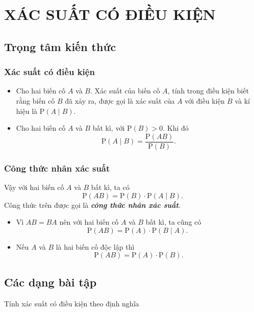 \setcounter{section}{0}
\section{XÁC SUẤT CÓ ĐIỀU KIỆN}
\subsection{Trọng tâm kiến thức}
\begin{tomtat}
	\subsubsection{Xác suất có điều kiện}
	\begin{boxdn}
	\begin{itemize}
	\item
	Cho hai biến cố $A$ và $B$. Xác suất của biến cố $A$, tính trong điều kiện biết rằng biến cố $B$ đã xảy ra, được gọi là xác suất của $A$ với điều kiện $B$ và kí hiệu là $\mathrm{P}(A\mid B)$.
	\item
	Cho hai biến cố $A$ và $B$ bất kì, với $\mathrm{P}(B)>0$. Khi đó
	$$\mathrm{P}(A \mid B)=\dfrac{\mathrm{P}(A B)}{\mathrm{P}(B)}.$$
	\end{itemize}
	\end{boxdn}
	\subsubsection{Công thức nhân xác suất}
	\begin{boxdn}
	Vậy với hai biến cố $A$ và $B$ bất kì, ta có
	$$\mathrm{P}(A B)=\mathrm{P}(B) \cdot \mathrm{P}(A \mid B).$$
	Công thức trên được gọi là \textbf{\textit{công thức nhân xác suất}}.
	\end{boxdn}
	\begin{note}
	\begin{itemize}
	\item Vì $AB=BA$ nên với hai biến cố $A$ và $B$ bất kì, ta cũng có
	$$\mathrm{P}(A B)=\mathrm{P}(A) \cdot \mathrm{P}(B \mid A) \text{. }$$
	\item Nếu $A$ và $B$ là hai biến cố độc lập thì
	$$\mathrm{P}(A B)=\mathrm{P}(A) \cdot \mathrm{P}(B).$$
	\end{itemize}
	\end{note}
\end{tomtat}
\subsection{Các dạng bài tập}
\begin{dang}{Tính xác suất có điều kiện theo định nghĩa}
\end{dang}
